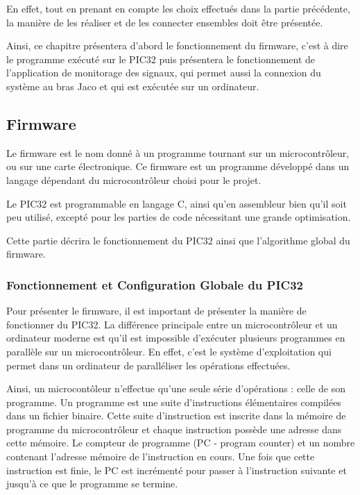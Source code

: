 \documentclass[letterpaper, twoside, 12pt, memoire, creativecommons, hyperref]{thETS}
\begin{document}
En effet, tout en prenant en compte les choix effectués dans la partie précédente, la manière de les réaliser et de les connecter ensembles doit être présentée. 

Ainsi, ce chapitre présentera d'abord le fonctionnement du firmware, c'est à dire le programme exécuté sur le PIC32 puis présentera le fonctionnement de l'application de monitorage des signaux, qui permet aussi la connexion du système au bras Jaco et qui est exécutée sur un ordinateur. 

\subsection{Firmware}

Le firmware est le nom donné à un programme tournant sur un microcontrôleur, ou sur une carte électronique. Ce firmware est un programme développé dans un langage dépendant du microcontrôleur choisi pour le projet. 

Le PIC32 est programmable en langage C, ainsi qu'en assembleur bien qu'il soit peu utilisé, excepté pour les parties de code nécessitant une grande optimisation. 

Cette partie décrira le fonctionnement du PIC32 ainsi que l'algorithme global du firmware. 

\subsubsection{Fonctionnement et Configuration Globale du PIC32}

Pour présenter le firmware, il est important de présenter la manière de fonctionner du PIC32. La différence principale entre un microcontrôleur et un ordinateur moderne est qu'il est impossible d'exécuter plusieurs programmes en parallèle sur un microcontrôleur. En effet, c'est le système d'exploitation qui permet dans un ordinateur de paralléliser les opérations effectuées. 

Ainsi, un microcontôleur n'effectue qu'une seule série d'opérations : celle de son programme. Un programme est une suite d'instructions élémentaires compilées dans un fichier binaire. Cette suite d'instruction est inscrite dans la mémoire de programme du microcontrôleur et chaque instruction possède une adresse dans cette mémoire. Le compteur de programme (PC - program counter) et un nombre contenant l'adresse mémoire de l'instruction en cours. Une fois que cette instruction est finie, le PC est incrémenté pour passer à l'instruction suivante et jusqu'à ce que le programme se termine. 
\end{document}
